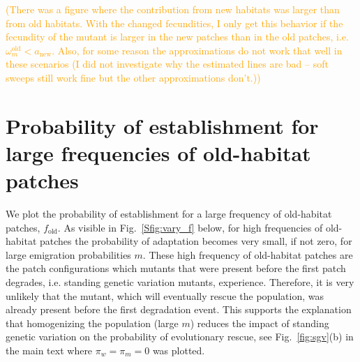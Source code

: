 \documentclass[11pt]{article}
\newcommand{\pete}[1]{\textcolor{orange}{(#1)}}
\newcommand{\chg}[1]{\textcolor{change}{#1}}
\begin{document}

\pete{There was a figure where the contribution from new habitats was larger than from old habitats. With the changed fecundities, I only get this behavior if the fecundity of the mutant is larger in the new patches than in the old patches, i.e. $\omega^\text{old}_m < a_{\text{new}}$. Also, for some reason the approximations do not work that well in these scenarios (I did not investigate why the estimated lines are bad -- soft sweeps still work fine but the other approximations don't.)}

\newpage
\renewcommand{\theequation}{D\arabic{equation}}
\setcounter{equation}{0}  %

\section{Probability of establishment for large frequencies of old-habitat patches}
\chg{We plot the probability of establishment for a large frequency of old-habitat patches, $f_{\text{old}}$. As visible in Fig.~\ref{Sfig:vary_f} below, for high frequencies of old-habitat patches the probability of adaptation becomes very small, if not zero, for large emigration probabilities $m$. These high frequency of old-habitat patches are the patch configurations which mutants that were present before the first patch degrades, i.e. standing genetic variation mutants, experience. Therefore, it is very unlikely that the mutant, which will eventually rescue the population, was already present before the first degradation event.} This supports the explanation that homogenizing the population (large $m$) reduces the impact of standing genetic variation on the probability of evolutionary rescue, see Fig.~\ref{fig:sgv}(b) in the main text where $\pi_w=\pi_m=0$ was plotted.
\end{document}
